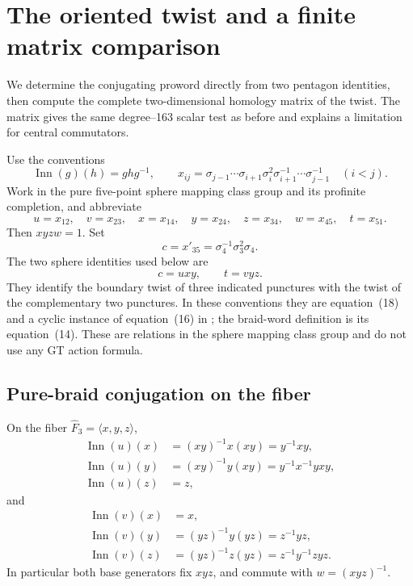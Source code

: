 \section{The oriented twist and a finite matrix comparison}
\label{sec:twist-matrix-comparison}

We determine the conjugating proword directly from two pentagon
identities, then compute the complete two-dimensional homology
matrix of the twist. The matrix gives the same degree--163 scalar
test as before and explains a limitation for central commutators.

Use the conventions
\[
 \operatorname{Inn}(g)(h)=ghg^{-1},\qquad
 x_{ij}=\sigma_{j-1}\cdots\sigma_{i+1}\sigma_i^2
                \sigma_{i+1}^{-1}\cdots\sigma_{j-1}^{-1}
                    \quad(i<j).
\]
Work in the pure five-point sphere mapping class group and its
profinite completion, and abbreviate
\[
 u=x_{12},\quad v=x_{23},\quad
 x=x_{14},\quad y=x_{24},\quad z=x_{34},\quad
 w=x_{45},\quad t=x_{51}.
\]
Then \(xyzw=1\). Set
\[
 c=x'_{35}=\sigma_4^{-1}\sigma_3^2\sigma_4.
\]
The two sphere identities used below are
\begin{equation}
 c=uxy,\qquad t=vyz.                                  \label{eq:twist-sphere-complements}
\end{equation}
They identify the boundary twist of three indicated punctures with
the twist of the complementary two punctures. In these conventions
they are equation~(18) and a cyclic instance of equation~(16) in
\cite{LS2015Twists}; the braid-word definition is its equation~(14).
These are relations in the sphere mapping class group and do not
use any GT action formula.

\subsection{Pure-braid conjugation on the fiber}

\begin{lemma}\label{lem:twist-direct-pure-braid}
On the fiber \(\widehat F_3=\langle x,y,z\rangle\),
\begin{align*}
 \operatorname{Inn}(u)(x)&=(xy)^{-1}x(xy)=y^{-1}xy,\\
 \operatorname{Inn}(u)(y)&=(xy)^{-1}y(xy)=y^{-1}x^{-1}yxy,\\
 \operatorname{Inn}(u)(z)&=z,
\end{align*}
and
\begin{align*}
 \operatorname{Inn}(v)(x)&=x,\\
 \operatorname{Inn}(v)(y)&=(yz)^{-1}y(yz)=z^{-1}yz,\\
 \operatorname{Inn}(v)(z)&=(yz)^{-1}z(yz)=z^{-1}y^{-1}zyz.
\end{align*}
In particular both base generators fix \(xyz\), and commute
with \(w=(xyz)^{-1}\).
\end{lemma}

